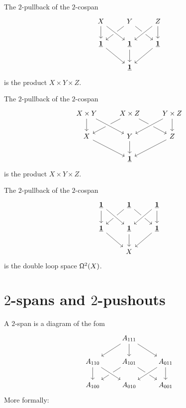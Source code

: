 \begin{cor}
The $2$-pullback of the $2$-cospan
\begin{equation*}
\begin{tikzcd}
X \arrow[d] & Y \arrow[dl] \arrow[dr] & Z \arrow[d] \\
\unit \arrow[dr] & \unit \arrow[d] \arrow[from=ul,crossing over] \arrow[from=ur,crossing over] & \unit \arrow[dl] \\
& \unit
\end{tikzcd}
\end{equation*}
is the product $X\times Y\times Z$. 
\end{cor}

\begin{cor}
The $2$-pullback of the $2$-cospan
\begin{equation*}
\begin{tikzcd}
X\times Y \arrow[d] & X\times Z \arrow[dl] \arrow[dr] & Y\times Z \arrow[d] \\
X \arrow[dr] & Y \arrow[d] \arrow[from=ul,crossing over] \arrow[from=ur,crossing over] & Z \arrow[dl] \\
& \unit
\end{tikzcd}
\end{equation*}
is the product $X\times Y\times Z$. 
\end{cor}

\begin{cor}
The $2$-pullback of the $2$-cospan
\begin{equation*}
\begin{tikzcd}
\unit \arrow[d] & \unit \arrow[dl] \arrow[dr] & \unit \arrow[d] \\
\unit \arrow[dr] & \unit \arrow[d] \arrow[from=ul,crossing over] \arrow[from=ur,crossing over] & \unit \arrow[dl] \\
& X
\end{tikzcd}
\end{equation*}
is the double loop space $\loopspace[2]{X}$. 
\end{cor}

\section{$2$-spans and $2$-pushouts}

A $2$-span is a diagram of the fom
\begin{equation*}
\begin{tikzcd}
& A_{111} \arrow[dl] \arrow[d] \arrow[dr] \\
A_{110} \arrow[d] & A_{101} \arrow[dl] \arrow[dr] & A_{011} \arrow[d] \\
A_{100} & A_{010} \arrow[from=ul,crossing over] \arrow[from=ur,crossing over] & A_{001}
\end{tikzcd}
\end{equation*}
More formally:

